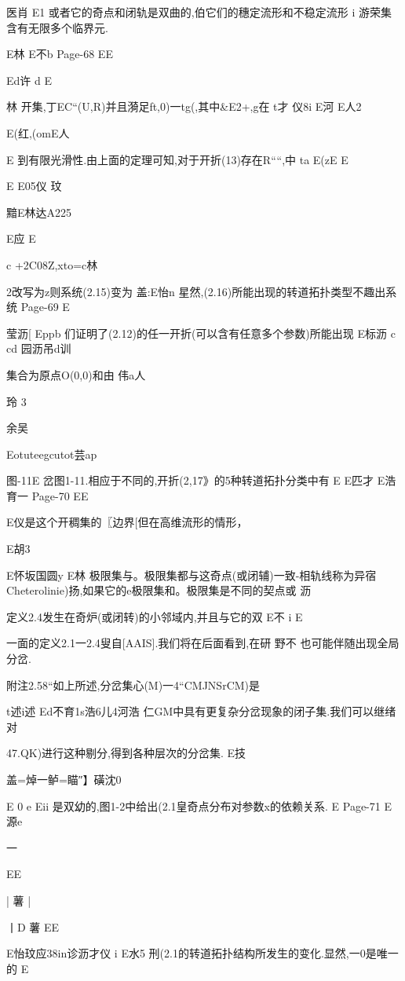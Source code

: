 {医肖
E1
或者它的奇点和闭轨是双曲的,伯它们的穗定流形和不稳定流形
i
游荣集含有无限多个临界元.

E林
E不b
Page-68
EE

Ed许
d
E

林
开集,丁EC“(U,R)并且漪足ft,0)一tg(,其中&E2+,g在
t才
仪8i
E河
E人2

E(红,(omE人

E
到有限光滑性.由上面的定理可知,对于开折(13)存在R““,中
ta
E(zE
E

E
E05仪
玟

黯E林达A225

E应
E

c
+2C08Z,xto=c林

2改写为z则系统(2.15)变为
盖:E怡n
星然,(2.16)所能出现的转道拓扑类型不趣出系统
Page-69
E

莹沥[
Eppb
们证明了(2.12)的任一开折(可以含有任意多个参数)所能出现
E标沥
c
cd
园沥吊d训

集合为原点O(0,0)和由
伟a人

玲
3

余吴

Eotuteegcutot芸ap

图-11E
岔图1-11.相应于不同的,开折(2,17》的5种转道拓扑分类中有
E
E匹才
E浩育一
Page-70
EE

E仪是这个开稠集的〖边界[但在高维流形的情形，

E胡3

E怀坂国圆y
E林
极限集与。极限集都与这奇点(或闭辅)一致-相轨线称为异宿
Cheterolinie)扬,如果它的e极限集和。极限集是不同的契点或
沥

定义2.4发生在奇炉(或闭转)的小邻域内,并且与它的双
E不
i
E

一面的定义2.1一2.4叟自[AAIS].我们将在后面看到,在研
野不
也可能伴随出现全局分岔.

附注2.58“如上所述,分岔集心(M)一4“CMJNSrCM)是

t述i述
Ed不育1s浩6儿4河浩
仁GM中具有更复杂分岔现象的闭子集.我们可以继绪对

47.QK)进行这种剔分,得到各种层次的分岔集.
E技

盖=焯一鲈=瞄″】磺沈0

E
0
e
Eii
是双幼的,图1-2中给出(2.1皇奇点分布对参数x的依赖关系.
E
Page-71
E源e

一

EE

|
薯
|

丨D
薯
EE

E怡玟应38in诊沥才仪
i
E水5
刑(2.1的转道拓扑结构所发生的变化.显然,一0是唯一的
E

}
